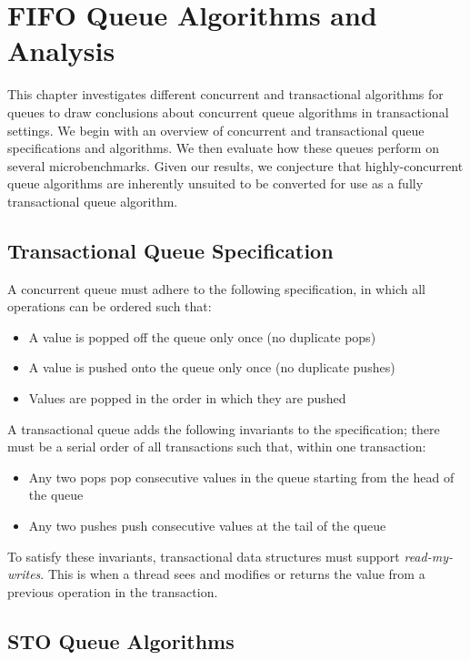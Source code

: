 \chapter{FIFO Queue Algorithms and Analysis}
\label{Queue}

This chapter investigates different concurrent and transactional algorithms for queues to draw conclusions about concurrent queue algorithms in transactional settings. We begin with an overview of concurrent and transactional queue specifications and algorithms. We then evaluate how these queues perform on several microbenchmarks. Given our results, we conjecture that highly-concurrent queue algorithms are inherently unsuited to be converted for use as a fully transactional queue algorithm.

\section{Transactional Queue Specification}

A concurrent queue must adhere to the following specification, in which all operations can be ordered such that:
\begin{itemize}
    \item A value is popped off the queue only once (no duplicate pops)
    \item A value is pushed onto the queue only once (no duplicate pushes)
    \item Values are popped in the order in which they are pushed
\end{itemize}

A transactional queue adds the following invariants to the specification; there must be a serial order of all transactions such that, within one transaction:
\begin{itemize}
    \item Any two pops pop consecutive values in the queue starting from the head of the queue 
    \item Any two pushes push consecutive values at the tail of the queue
\end{itemize}

To satisfy these invariants, transactional data structures must support \emph{read-my-writes}. This is when a thread sees and modifies or returns the value from a previous operation in the transaction.

\section{STO Queue Algorithms}

